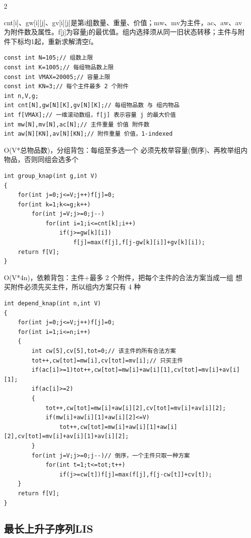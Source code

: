 \documentclass[UTF8,fontset=fandol,a4paper,twoside]{ctexart}
\newcommand{\note}[1]{{\fontsize{10}{12}\selectfont #1\par}}
\begin{document}
\begin{multicols}{2}
\note{cnt[\allowbreak{}i]\allowbreak{}、gw[\allowbreak{}i]\allowbreak{}[\allowbreak{}j]\allowbreak{}、gv[\allowbreak{}i]\allowbreak{}[\allowbreak{}j]\allowbreak{}是第i组数量、重量、价值；mw、mv为主件，ac、aw、av为附件数及属性。f[\allowbreak{}j]\allowbreak{}为容量j的最优值。组内选择须从同一旧状态转移；主件与附件下标均1起，重新求解清空f。}
\begin{lstlisting}
const int N=105;// 组数上限
const int K=1005;// 每组物品数上限
const int VMAX=20005;// 容量上限
const int KN=3;// 每个主件最多 2 个附件
int n,V,g;
int cnt[N],gw[N][K],gv[N][K];// 每组物品数 与 组内物品
int f[VMAX];// 一维滚动数组，f[j] 表示容量 j 的最大价值
int mw[N],mv[N],ac[N];// 主件重量 价值 附件数
int aw[N][KN],av[N][KN];// 附件重量 价值，1-indexed
\end{lstlisting}
\note{O(\allowbreak{}V*总物品数)\allowbreak{}，分组背包：每组至多选一个 必须先枚举容量(\allowbreak{}倒序)\allowbreak{}、再枚举组内物品，否则同组会选多个}
\begin{lstlisting}
int group_knap(int g,int V)
{
    for(int j=0;j<=V;j++)f[j]=0;
    for(int k=1;k<=g;k++)
        for(int j=V;j>=0;j--)
            for(int i=1;i<=cnt[k];i++)
                if(j>=gw[k][i])
                    f[j]=max(f[j],f[j-gw[k][i]]+gv[k][i]);
    return f[V];
}
\end{lstlisting}
\note{O(\allowbreak{}V*4n)\allowbreak{}，依赖背包：主件+\allowbreak{}最多 2 个附件，把每个主件的合法方案当成一组 想买附件必须先买主件，所以组内方案只有 4 种}
\begin{lstlisting}
int depend_knap(int n,int V)
{
    for(int j=0;j<=V;j++)f[j]=0;
    for(int i=1;i<=n;i++)
    {
        int cw[5],cv[5],tot=0;// 该主件的所有合法方案
        tot++,cw[tot]=mw[i],cv[tot]=mv[i];// 只买主件
        if(ac[i]>=1)tot++,cw[tot]=mw[i]+aw[i][1],cv[tot]=mv[i]+av[i][1];
        if(ac[i]>=2)
        {
            tot++,cw[tot]=mw[i]+aw[i][2],cv[tot]=mv[i]+av[i][2];
            if(mw[i]+aw[i][1]+aw[i][2]<=V)
                tot++,cw[tot]=mw[i]+aw[i][1]+aw[i][2],cv[tot]=mv[i]+av[i][1]+av[i][2];
        }
        for(int j=V;j>=0;j--)// 倒序，一个主件只取一种方案
            for(int t=1;t<=tot;t++)
                if(j>=cw[t])f[j]=max(f[j],f[j-cw[t]]+cv[t]);
    }
    return f[V];
}
\end{lstlisting}
\subsection{最长上升子序列LIS}


\end{multicols}
\end{document}
